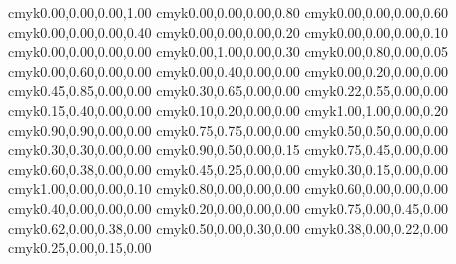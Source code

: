 %
%
%
%
\definecolor{black}               {cmyk}{0.00,0.00,0.00,1.00}
\definecolor{verydarkgrey}        {cmyk}{0.00,0.00,0.00,0.80}
\definecolor{darkgrey}            {cmyk}{0.00,0.00,0.00,0.60}
\definecolor{grey}                {cmyk}{0.00,0.00,0.00,0.40}
\definecolor{lightgrey}           {cmyk}{0.00,0.00,0.00,0.20}
\definecolor{verylightgrey}       {cmyk}{0.00,0.00,0.00,0.10}
\definecolor{white}               {cmyk}{0.00,0.00,0.00,0.00}
\definecolor{verydarkmagenta}     {cmyk}{0.00,1.00,0.00,0.30}
\definecolor{darkmagenta}         {cmyk}{0.00,0.80,0.00,0.05}
\definecolor{magenta}             {cmyk}{0.00,0.60,0.00,0.00}
\definecolor{lightmagenta}        {cmyk}{0.00,0.40,0.00,0.00}
\definecolor{verylightmagenta}    {cmyk}{0.00,0.20,0.00,0.00}
\definecolor{verydarkviolet}      {cmyk}{0.45,0.85,0.00,0.00}
\definecolor{darkviolet}          {cmyk}{0.30,0.65,0.00,0.00}
\definecolor{violet}              {cmyk}{0.22,0.55,0.00,0.00}
\definecolor{lightviolet}         {cmyk}{0.15,0.40,0.00,0.00}
\definecolor{verylightviolet}     {cmyk}{0.10,0.20,0.00,0.00}
\definecolor{verydarkblue}        {cmyk}{1.00,1.00,0.00,0.20}
\definecolor{darkblue}            {cmyk}{0.90,0.90,0.00,0.00}
\definecolor{blue}                {cmyk}{0.75,0.75,0.00,0.00}
\definecolor{lightblue}           {cmyk}{0.50,0.50,0.00,0.00}
\definecolor{verylightblue}       {cmyk}{0.30,0.30,0.00,0.00}
\definecolor{verydarkskyblue}     {cmyk}{0.90,0.50,0.00,0.15}
\definecolor{darkskyblue}         {cmyk}{0.75,0.45,0.00,0.00}
\definecolor{skyblue}             {cmyk}{0.60,0.38,0.00,0.00}
\definecolor{lightskyblue}        {cmyk}{0.45,0.25,0.00,0.00}
\definecolor{verylightskyblue}    {cmyk}{0.30,0.15,0.00,0.00}
\definecolor{verydarkcyan}        {cmyk}{1.00,0.00,0.00,0.10}
\definecolor{darkcyan}            {cmyk}{0.80,0.00,0.00,0.00}
\definecolor{cyan}                {cmyk}{0.60,0.00,0.00,0.00}
\definecolor{lightcyan}           {cmyk}{0.40,0.00,0.00,0.00}
\definecolor{verylightcyan}       {cmyk}{0.20,0.00,0.00,0.00}
\definecolor{verydarkseagreen}    {cmyk}{0.75,0.00,0.45,0.00}
\definecolor{darkseagreen}        {cmyk}{0.62,0.00,0.38,0.00}
\definecolor{seagreen}            {cmyk}{0.50,0.00,0.30,0.00}
\definecolor{lightseagreen}       {cmyk}{0.38,0.00,0.22,0.00}
\definecolor{verylightseagreen}   {cmyk}{0.25,0.00,0.15,0.00}
